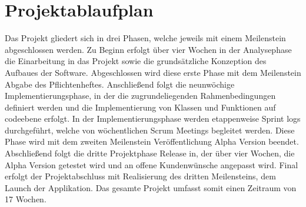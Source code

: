 \documentclass[a4paper,12pt]{article}
\begin{document}
\section{Projektablaufplan}
Das Projekt gliedert sich in drei Phasen, welche jeweils mit einem Meilenstein abgeschlossen werden. Zu Beginn erfolgt über vier Wochen in der Analysephase die Einarbeitung in das Projekt sowie die grundsätzliche Konzeption des Aufbaues der Software. Abgeschlossen wird diese erste Phase mit dem Meilenstein Abgabe des Pflichtenheftes. Anschließend folgt die neunwöchige Implementierungsphase, in der die zugrundeliegenden Rahmenbedingungen definiert werden und die Implementierung von Klassen und Funktionen auf codeebene erfolgt. In der Implementierungsphase werden etappenweise Sprint logs durchgeführt, welche von wöchentlichen Scrum Meetings begleitet werden. Diese Phase wird mit dem zweiten Meilenstein Veröffentlichung Alpha Version beendet. Abschließend folgt die dritte Projektphase Release in, der über vier Wochen, die Alpha Version getestet wird und an offene Kundenwünsche angepasst wird. Final erfolgt der Projektabschluss mit Realisierung des dritten Meilensteins, dem Launch der Applikation. Das gesamte Projekt umfasst somit einen Zeitraum von 17 Wochen.\\

\label{Projektablaufplan}
\end{document}
